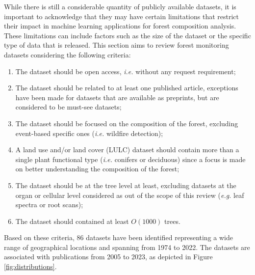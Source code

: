 \documentclass{CUP-JNL-DTM}%
\theoremstyle{definition}
\numberwithin{equation}{section}
\begin{document}
While there is still a considerable quantity of publicly available datasets, it is important to acknowledge that they may have certain limitations that restrict their impact in machine learning applications for forest composition analysis. These limitations can include factors such as the size of the dataset or the specific type of data that is released.
This section aims to review forest monitoring datasets considering the following criteria:
\begin{enumerate}
    \item The dataset should be open access, \textit{i.e.} without any request requirement;
    \item The dataset should be related to at least one published article, exceptions have been made for datasets that are available as preprints, but are considered to be must-see datasets;
    \item The dataset should be focused on the composition of the forest, excluding event-based specific ones (\textit{i.e.} wildfire detection);
    \item A land use and/or land cover (LULC) dataset should contain more than a single plant functional type (\textit{i.e.} conifers or deciduous) since a focus is made on better understanding the composition of the forest;
    \item The dataset should be at the tree level at least, excluding datasets at the organ or cellular level considered as out of the scope of this review (\textit{e.g.} leaf spectra or root scans);
    \item The dataset should contained at least $O(1000)$ trees. %
\end{enumerate}
%
Based on these criteria, 86 datasets have been identified representing a wide range of geographical locations and spanning from 1974 to 2022. The datasets are associated with publications from 2005 to 2023, as depicted in Figure \ref{fig:distributions}.
\end{document}
